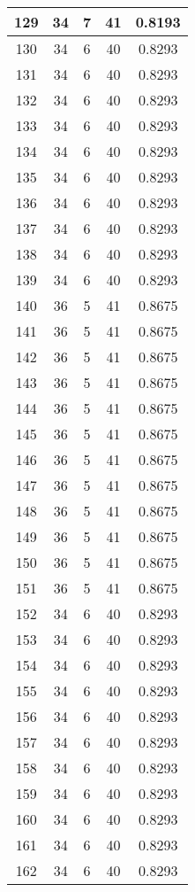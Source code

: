 \documentclass[letterpaper, 12pt]{article}
\begin{document}
\begin{longtable}{|c|c|c|c|c|}
\hline
129 & 34 & 7 & 41 & 0.8193 \\
\hline
130 & 34 & 6 & 40 & 0.8293 \\
\hline
131 & 34 & 6 & 40 & 0.8293 \\
\hline
132 & 34 & 6 & 40 & 0.8293 \\
\hline
133 & 34 & 6 & 40 & 0.8293 \\
\hline
134 & 34 & 6 & 40 & 0.8293 \\
\hline
135 & 34 & 6 & 40 & 0.8293 \\
\hline
136 & 34 & 6 & 40 & 0.8293 \\
\hline
137 & 34 & 6 & 40 & 0.8293 \\
\hline
138 & 34 & 6 & 40 & 0.8293 \\
\hline
139 & 34 & 6 & 40 & 0.8293 \\
\hline
140 & 36 & 5 & 41 & 0.8675 \\
\hline
141 & 36 & 5 & 41 & 0.8675 \\
\hline
142 & 36 & 5 & 41 & 0.8675 \\
\hline
143 & 36 & 5 & 41 & 0.8675 \\
\hline
144 & 36 & 5 & 41 & 0.8675 \\
\hline
145 & 36 & 5 & 41 & 0.8675 \\
\hline
146 & 36 & 5 & 41 & 0.8675 \\
\hline
147 & 36 & 5 & 41 & 0.8675 \\
\hline
148 & 36 & 5 & 41 & 0.8675 \\
\hline
149 & 36 & 5 & 41 & 0.8675 \\
\hline
150 & 36 & 5 & 41 & 0.8675 \\
\hline
151 & 36 & 5 & 41 & 0.8675 \\
\hline
152 & 34 & 6 & 40 & 0.8293 \\
\hline
153 & 34 & 6 & 40 & 0.8293 \\
\hline
154 & 34 & 6 & 40 & 0.8293 \\
\hline
155 & 34 & 6 & 40 & 0.8293 \\
\hline
156 & 34 & 6 & 40 & 0.8293 \\
\hline
157 & 34 & 6 & 40 & 0.8293 \\
\hline
158 & 34 & 6 & 40 & 0.8293 \\
\hline
159 & 34 & 6 & 40 & 0.8293 \\
\hline
160 & 34 & 6 & 40 & 0.8293 \\
\hline
161 & 34 & 6 & 40 & 0.8293 \\
\hline
162 & 34 & 6 & 40 & 0.8293 \\

\end{longtable}
\end{document}
